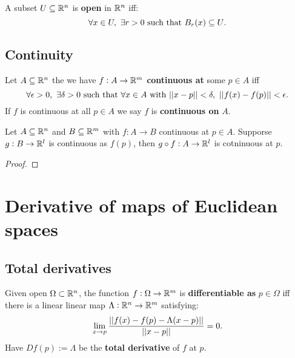 \documentclass[../Year2.tex]{subfiles}
\begin{document}
\begin{definition}
    A subset $U\subseteq\mathbb{R}^n$ is \textbf{open} in $\mathbb{R}^n$ iff: \[
        \forall x\in U, \ \exists r>0 \ \black{such that } B_r(x)\subseteq U\black{.}
    \]
\end{definition}

\vspace{-40pt}

\subsection{Continuity}

\begin{definition}[Continuity]
    Let $A\subseteq \mathbb{R}^n$ the we have $f:A\rightarrow \mathbb{R}^m$ \textbf{continuous at} some $p\in A$ iff \[
        \forall\epsilon>0, \ \exists\delta>0 \ \black{such that } \forall x\in A \ \black{with } ||x-p||<\delta, \ ||f(x)-f(p)||<\epsilon\black{.} 
    \] If $f$ is continuous at all $p\in A$ we say $f$ is \textbf{continuous on} $A$.
\end{definition}

\begin{theorem}
    Let $A\subseteq\mathbb{R}^n$ and $B\subseteq\mathbb{R}^m$ with $f:A\rightarrow B$ continuous at $p\in A$. Supporse $g:B\rightarrow\mathbb{R}^l$ is continuous as $f(p)$, then $g\circ f:A\rightarrow\mathbb{R}^l$ is cotninuous at $p$.
    \begin{proof}
        
    \end{proof}
\end{theorem}

\section{Derivative of maps of Euclidean spaces}

\subsection{Total derivatives}

\begin{definition}
    Given open $\Omega\subset\mathbb{R}^n$, the function $f:\Omega\rightarrow \mathbb{R}^m$ is \textbf{differentiable as} $p\in\Omega$ iff there is a linear linear map $\Lambda:\mathbb{R}^n\rightarrow\mathbb{R}^m$ satisfying: \[
        \lim_{x\rightarrow p} \frac{||f(x)-f(p)-\Lambda(x-p)||}{||x-p||}=0\text{\textcolor{black}{.}}
    \] Have $Df(p):=\Lambda$ be the \textbf{total derivative} of $f$ at $p$.
\end{definition}
\end{document}

